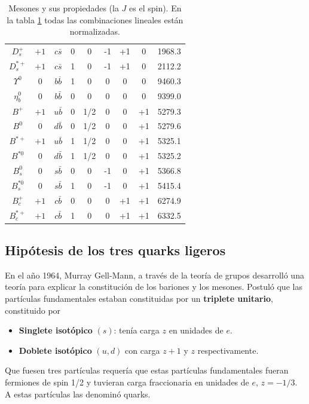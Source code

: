 \begin{table}[h]
\begin{tabular}{|c|c|c|c|c|c|c|c|c|}
        $D_{s}^{+}$ & $+1$ & $c\bar{s}$ & 0 & 0 & -1 & +1 & 0 & 1968.3 \\ 
        $D_{s}^{*+}$ & $+1$ & $c\bar{s}$ & 1 & 0 & -1 & +1 & 0 & 2112.2 \\ 
        \hline \hline 
        $\Upsilon^{0}$ & $0$ & $b\overline{b}$ & 1 & 0 & 0 & 0 & 0 & 9460.3 \\ 
        $\eta_{b}^{0}$ & $0$ & $b\bar{b}$ & 0 & 0 & 0 & 0 & 0 & 9399.0 \\ 
        $B^{+}$ & $+1$ & $u\bar{b}$ & 0 & 1/2 & 0 & 0 & +1 & 5279.3 \\ 
        $B^{0}$ & $0$ & $d\bar{b}$ & 0 & 1/2 & 0 & 0 & +1 & 5279.6 \\ 
        $B^{*+}$ & $+1$ & $u\bar{b}$ & 1 & 1/2 & 0 & 0 & +1 & 5325.1 \\ 
        $B^{*0}$ & $0$ & $d\bar{b}$ & 1 & 1/2 & 0 & 0 & +1 & 5325.2 \\ 
        $B_{s}^{0}$ & $0$ & $s\bar{b}$ & 0 & 0 & -1 & 0 & +1 & 5366.8 \\ 
        $B_{s}^{*0}$ & $0$ & $s\bar{b}$ & 1 & 0 & -1 & 0 & +1 & 5415.4 \\ 
        $B_{c}^{+}$ & $+1$ & $c\bar{b}$ & 0 & 0 & 0 & +1 & +1 & 6274.9 \\ 
        $B_{c}^{*+}$ & $+1$ & $c\bar{b}$ & 1 & 0 & 0 & +1 & +1 & 6332.5 \\ 
        \hline 
    \end{tabular}
    \caption{Mesones y sus propiedades (la $J$ es el spin). En la tabla \ref{tab: Mesones} todas las combinaciones lineales están normalizadas. }
    \label{tab: Mesones}
\end{table}

\clearpage
\subsection{Hipótesis de los tres quarks ligeros} \label{subsec: hipotesis tres quarks ligeros}
En el año 1964, Murray Gell-Mann, a través de la teoría de grupos desarrolló una teoría para explicar la constitución de los bariones y los mesones. Postuló que las partículas fundamentales estaban constituidas por un \textbf{triplete unitario}, constituido por 
\begin{itemize}
    \item \textbf{Singlete isotópico} $(s)$: tenía carga $z$ en unidades de $e$.
    \item \textbf{Doblete isotópico} $(u,d)$ con carga $z+1$ y $z$ respectivamente.
\end{itemize}
Que fuesen tres partículas requería que estas partículas fundamentales fueran fermiones de spin 1/2 y tuvieran carga fraccionaria en unidades de $e$, $z=-1/3$. A estas partículas las denominó quarks.
